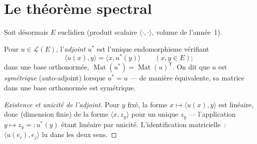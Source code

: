\section{Le théorème spectral}

Soit désormais $E$ euclidien (produit scalaire
$\langle\cdot,\cdot\rangle$, volume de l'année~1).

\begin{definition}\label{def:b2:quadratic:adjoint}
Pour $u \in \mathcal{L}(E)$, l'\emph{adjoint}
$u^*$ est l'unique endomorphisme vérifiant
\[
\langle u(x), y\rangle = \langle x, u^*(y)\rangle
\qquad (x, y \in E);
\]
dans une base orthonormée, $\operatorname{Mat}(u^*) =
\operatorname{Mat}(u)^{\mathsf T}$. On dit que $u$ est
\emph{symétrique} (auto-adjoint)
lorsque $u^* = u$ --- de manière équivalente, sa matrice dans une
base orthonormée est symétrique.
\end{definition}

\begin{proof}[Existence et unicité de l'adjoint]
Pour $y$ fixé, la forme $x \mapsto \langle u(x), y\rangle$ est
linéaire, donc (dimension finie) de la forme $\langle x,
z_y\rangle$ pour un unique $z_y$ --- l'application $y \mapsto z_y =:
u^*(y)$ étant linéaire par unicité. L'identification matricielle~:
$\langle u(e_i), e_j\rangle$ lu dans les deux sens.
\end{proof}

